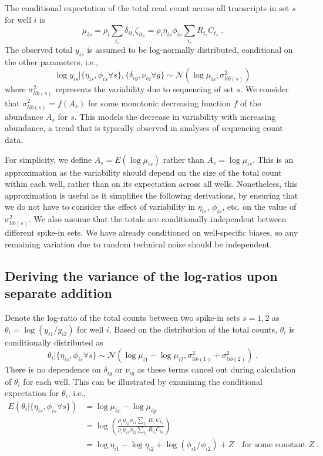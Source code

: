 \documentclass{article}
\begin{document}
The conditional expectation of the total read count across all transcripts in set $s$ for well $i$ is
\[
    \mu_{is} = \rho_i  \textstyle\sum_{t_s} \delta_{it_s} \zeta_{it_s} = \rho_i  \eta_{is} \phi_{is} \sum_{t_s} R_{t_s} C_{t_s} \;.
\]
The observed total $y_{is}$ is assumed to be log-normally distributed, conditional on the other parameters, i.e., 
\[
    \log y_{is} | \{ \eta_{is}, \phi_{is} \forall s \}, \{ \delta_{ig}, \nu_{ig} \forall g \} \sim \mathcal{N}(\log \mu_{is}, \sigma^2_{lib(s)})
\]
where $\sigma^2_{lib(s)}$ represents the variability due to sequencing of set $s$.
We consider that $\sigma^2_{lib(s)} = f(A_s)$ for some monotonic decreasing function $f$ of the abundance $A_s$ for $s$.
This models the decrease in variability with increasing abundance, a trend that is typically observed in analyses of sequencing count data.

For simplicity, we define $A_s = E(\log \mu_{is})$ rather than $A_s = \log \mu_{is}$.
This is an approximation as the variability should depend on the size of the total count within each well, rather than on its expectation across all wells.
Nonetheless, this approximation is useful as it simplifies the following derivations, by ensuring that we do not have to consider the effect of variability in $\eta_{is}$, $\phi_{is}$, etc. on the value of $\sigma^2_{lib(s)}$.
We also assume that the totals are conditionally independent between different spike-in sets.
We have already conditioned on well-specific biases, so any remaining variation due to random technical noise should be independent.

\subsection{Deriving the variance of the log-ratios upon separate addition}
Denote the log-ratio of the total counts between two spike-in sets $s=1, 2$ as $\theta_i = \log(y_{i1}/y_{i2})$ for well $i$.
Based on the distribution of the total counts, $\theta_i$ is conditionally distributed as
\[
    \theta_i |  \{ \eta_{is}, \phi_{is} \forall s \} \sim \mathcal{N}( \log \mu_{i1} - \log \mu_{i2}, \sigma^2_{lib(1)} + \sigma^2_{lib(2)} ) \;. 
\]
There is no dependence on $\delta_{ig}$ or $\nu_{ig}$ as these terms cancel out during calculation of $\theta_i$ for each well.
This can be illustrated by examining the conditional expectation for $\theta_i$, i.e.,
\begin{align*}
    E(\theta_i |  \{ \eta_{is}, \phi_{is} \forall s \})
    &= \log \mu_{ix} - \log \mu_{iy} \\
    &= \log \left( \frac{\rho_i \eta_{i1} \phi_{i1} \sum_{t_1} R_{t_1} C_{t_1}}{\rho_i \eta_{i2} \phi_{i2} \sum_{t_2} R_{t_2} C_{t_2}} \right) \\
    &= \log \eta_{i1} - \log \eta_{i2} +  \log (\phi_{i1} / \phi_{i2})  + Z \quad\mbox{for some constant } Z \;.
\end{align*}
\end{document}
